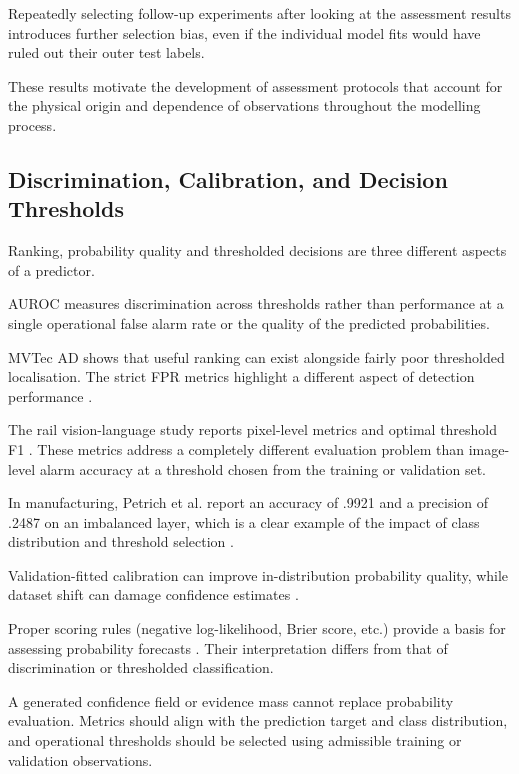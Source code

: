 Repeatedly selecting follow-up experiments after looking at the assessment results introduces
further selection bias, even if the individual model fits would have ruled out their outer test
labels.

These results motivate the development of assessment protocols that account for the physical origin
and dependence of observations throughout the modelling process.

\subsection{Discrimination, Calibration, and Decision Thresholds}

Ranking, probability quality and thresholded decisions are three different aspects of a predictor.

AUROC measures discrimination across thresholds rather than performance at a single operational
false alarm rate or the quality of the predicted probabilities.

MVTec AD shows that useful ranking can exist alongside fairly poor thresholded localisation. The
strict FPR metrics highlight a different aspect of detection performance
\citep{Bergmann2019MVTec,Costanzino2024Multimodal,Cheng2025Multimodal}.

The rail vision-language study reports pixel-level metrics and optimal threshold F1 \citep[PDF
p.~7]{P031}. These metrics address a completely different evaluation problem than image-level alarm
accuracy at a threshold chosen from the training or validation set.

In manufacturing, Petrich et al. report an accuracy of .9921 and a precision of .2487 on an
imbalanced layer, which is a clear example of the impact of class distribution and threshold
selection \citep{Petrich2021Multimodal}.

Validation-fitted calibration can improve in-distribution probability quality, while dataset shift
can damage confidence estimates \citep{Guo2017Calibration,P008}.

Proper scoring rules (negative log-likelihood, Brier score, etc.) provide a basis for assessing
probability forecasts \citep{P055}. Their interpretation differs from that of discrimination or
thresholded classification.

A generated confidence field or evidence mass cannot replace probability evaluation. Metrics should
align with the prediction target and class distribution, and operational thresholds should be
selected using admissible training or validation observations.

